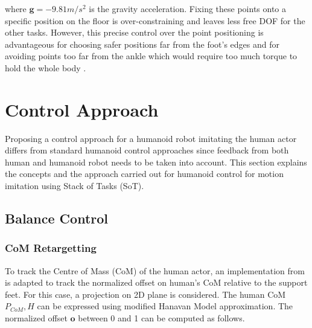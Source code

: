 where $\mathbf{g} = -9.81 m/s^2$ is the gravity acceleration. Fixing these points onto a specific position on the floor is 
over-constraining and leaves less free DOF for the other tasks. However, this precise control over the point positioning is advantageous
for choosing safer positions far from the foot’s edges and for avoiding points too far from the ankle which would require too much torque
to hold the whole body \cite{louisepouble}.


\section{Control Approach}

Proposing a control approach for a humanoid robot imitating the human actor differs from standard humanoid control approaches since 
feedback from both human and humanoid robot needs to be taken into account. This section explains the concepts and the approach 
carried out for humanoid control for motion imitation using Stack of Tasks (SoT).

\subsection{Balance Control}

\subsubsection{CoM Retargetting}

To track the Centre of Mass (CoM) of the human actor, an implementation from \cite{penco:hal-01895145} is adapted to track the normalized offset on
human's CoM relative to the support feet. For this case, a projection on 2D plane is considered. The human CoM $P_{CoM}, H$ can be 
expressed using modified Hanavan Model approximation. The normalized offset $\mathbf{o}$ between 0 and 1 can be computed as follows.



